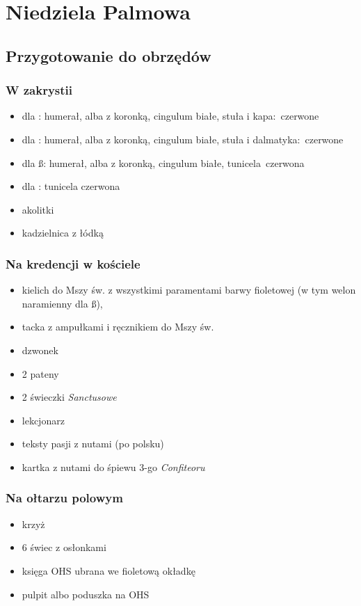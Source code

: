 \chapter{Niedziela Palmowa}

\section{Przygotowanie do obrzędów}

\subsection{W zakrystii}
\begin{itemize}
	\item dla \ii: humerał, alba z koronką, cingulum białe, stuła i
	      kapa: {\color{red}czerwone}
	\item dla \dd: humerał, alba z koronką, cingulum białe, stuła i
	      dalmatyka: {\color{red}czerwone}
	\item dla \ss: humerał, alba z koronką, cingulum białe,
	      tunicela {\color{red}czerwona}
	\item dla : tunicela {\color{red}czerwona}
	\item akolitki
	\item kadzielnica z łódką
\end{itemize}

\subsection{Na kredencji w kościele}
\begin{itemize}
	\item kielich do Mszy św. z wszystkimi paramentami barwy
		      {\color{violet}fioletowej} (w tym welon naramienny dla \ss),
	\item tacka z ampułkami i ręcznikiem do Mszy św.
	\item dzwonek
	\item 2 pateny
	\item 2 świeczki \textit{Sanctusowe}
	\item lekcjonarz
	\item teksty pasji z nutami (po polsku)
	\item kartka z nutami do śpiewu 3-go \textit{Confiteoru}
\end{itemize}

\subsection{Na ołtarzu polowym}
\begin{itemize}
	\item krzyż
	\item 6 świec z osłonkami
	\item księga OHS ubrana we {\color{violet}fioletową} okładkę
	\item pulpit albo poduszka na OHS
\end{itemize}

